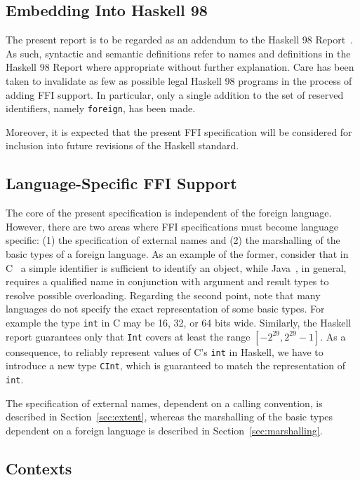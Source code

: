 \documentclass[a4paper,twosides]{article}
\newcommand{\code}[1]{\texttt{#1}}      %
\begin{document}
\subsection{Embedding Into Haskell 98}

The present report is to be regarded as an addendum to the Haskell 98
Report~\cite{haskell98}.  As such, syntactic and semantic definitions refer to
names and definitions in the Haskell 98 Report where appropriate without
further explanation.  Care has been taken to invalidate as few as possible
legal Haskell 98 programs in the process of adding FFI support.  In
particular, only a single addition to the set of reserved identifiers, namely
\code{foreign}, has been made.

Moreover, it is expected that the present FFI specification will be considered
for inclusion into future revisions of the Haskell standard.

\subsection{Language-Specific FFI Support}

The core of the present specification is independent of the foreign language.
However, there are two areas where FFI specifications must become language
specific: (1) the specification of external names and (2) the marshalling of
the basic types of a foreign language.  As an example of the former, consider
that in C~\cite{C} a simple identifier is sufficient to identify an object,
while Java~\cite{gosling-etal:Java}, in general, requires a qualified name in
conjunction with argument and result types to resolve possible overloading.
Regarding the second point, note that many languages do not specify the exact
representation of some basic types.  For example the type \code{int} in C may
be 16, 32, or 64 bits wide.  Similarly, the Haskell report guarantees only that
\code{Int} covers at least the range \([-2^{29}, 2^{29} - 1]\).  As a
consequence, to reliably represent values of C's \code{int} in Haskell, we
have to introduce a new type \code{CInt}, which is guaranteed to match the
representation of \code{int}.

The specification of external names, dependent on a calling convention, is
described in Section~\ref{sec:extent}, whereas the marshalling of the basic
types dependent on a foreign language is described in
Section~\ref{sec:marshalling}.

\subsection{Contexts}
\end{document}
